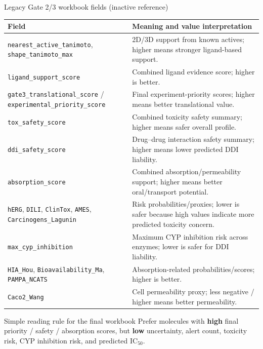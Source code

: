 \documentclass[aspectratio=169,10pt]{beamer}
\begin{document}
\begin{frame}{Legacy Gate 2/3 workbook fields (inactive reference)}
  \scriptsize
  \begin{tabularx}{\textwidth}{lX}
    \toprule
    \textbf{Field} & \textbf{Meaning and value interpretation} \\
    \midrule
    \texttt{nearest\_active\_tanimoto}, \texttt{shape\_tanimoto\_max} & 2D/3D support from known actives; higher means stronger ligand-based support. \\
    \texttt{ligand\_support\_score} & Combined ligand evidence score; higher is better. \\
    \texttt{gate3\_translational\_score} / \texttt{experimental\_priority\_score} & Final experiment-priority scores; higher means better translational value. \\
    \texttt{tox\_safety\_score} & Combined toxicity safety summary; higher means safer overall profile. \\
    \texttt{ddi\_safety\_score} & Drug--drug interaction safety summary; higher means lower predicted DDI liability. \\
    \texttt{absorption\_score} & Combined absorption/permeability support; higher means better oral/transport potential. \\
    \texttt{hERG}, \texttt{DILI}, \texttt{ClinTox}, \texttt{AMES}, \texttt{Carcinogens\_Lagunin} & Risk probabilities/proxies; lower is safer because high values indicate more predicted toxicity concern. \\
    \texttt{max\_cyp\_inhibition} & Maximum CYP inhibition risk across enzymes; lower is safer for DDI liability. \\
    \texttt{HIA\_Hou}, \texttt{Bioavailability\_Ma}, \texttt{PAMPA\_NCATS} & Absorption-related probabilities/scores; higher is better. \\
    \texttt{Caco2\_Wang} & Cell permeability proxy; less negative / higher means better permeability. \\
    \bottomrule
  \end{tabularx}

  \vspace{2pt}
  \begin{alertblock}{Simple reading rule for the final workbook}
    Prefer molecules with \textbf{high} final priority / safety / absorption scores,
    but \textbf{low} uncertainty, alert count, toxicity risk, CYP inhibition risk,
    and predicted IC\(_{50}\).
  \end{alertblock}
\end{frame}
\end{document}

